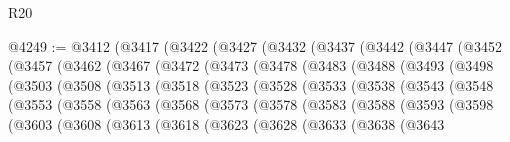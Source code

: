 \begin{lexlean}{R20}
\begin{coremodule}
{@4249 := @3412
    (@3417
      (@3422
        (@3427
          (@3432
            (@3437
              (@3442
                (@3447
                  (@3452
                    (@3457
                      (@3462
                        (@3467
                          (@3472
                            (@3473
                              (@3478
                                (@3483
                                  (@3488
                                    (@3493
                                      (@3498
                                        (@3503
                                          (@3508
                                            (@3513
                                              (@3518
                                                (@3523
                                                  (@3528
                                                    (@3533
                                                      (@3538
                                                        (@3543
                                                          (@3548
                                                            (@3553
                                                              (@3558
                                                                (@3563
                                                                  (@3568
                                                                    (@3573
                                                                      (@3578
                                                                        (@3583
                                                                          (@3588
                                                                            (@3593
                                                                              (@3598
                                                                                (@3603
                                                                                  (@3608
                                                                                    (@3613
                                                                                      (@3618
                                                                                        (@3623
                                                                                          (@3628
                                                                                            (@3633
                                                                                              (@3638
                                                                                                (@3643
}
\end{coremodule}
\end{lexlean}
